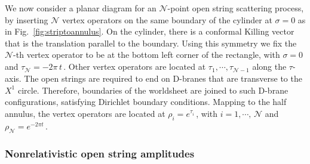 \documentclass[11pt]{article}
\newcommand{\CN}{\mathcal{N}}
\begin{document}
We now consider a planar diagram for an $\CN$-point open string scattering process, by inserting $\CN$ vertex operators on the same boundary of the cylinder at $\sigma = 0$ as in Fig.~\ref{fig:striptoannulus}. On the cylinder, there is a conformal Killing vector that is the translation parallel to the boundary. Using this symmetry we fix the $\CN$-th vertex operator to be at the bottom left corner of the rectangle, with $\sigma = 0$ and $\tau^{}_\CN = - 2\pi\,t$\,. Other vertex operators are located at $\tau_1^{}, \cdots, \tau_{\CN-1}^{}$ along the $\tau$-axis. The open strings are required to end on D-branes that are transverse to the $X^1$ circle. Therefore, boundaries of the worldsheet are joined to such D-brane configurations, satisfying Dirichlet boundary conditions.
Mapping to the half annulus, the vertex operators are located at 
$\rho^{}_i = e^{\tau^{}_i}$\,, with $i = 1, \cdots, \, \CN$ and $\rho^{}_\CN = e^{-2\pi t}$\,. 

\subsubsection*{Nonrelativistic open string amplitudes}
\end{document}
